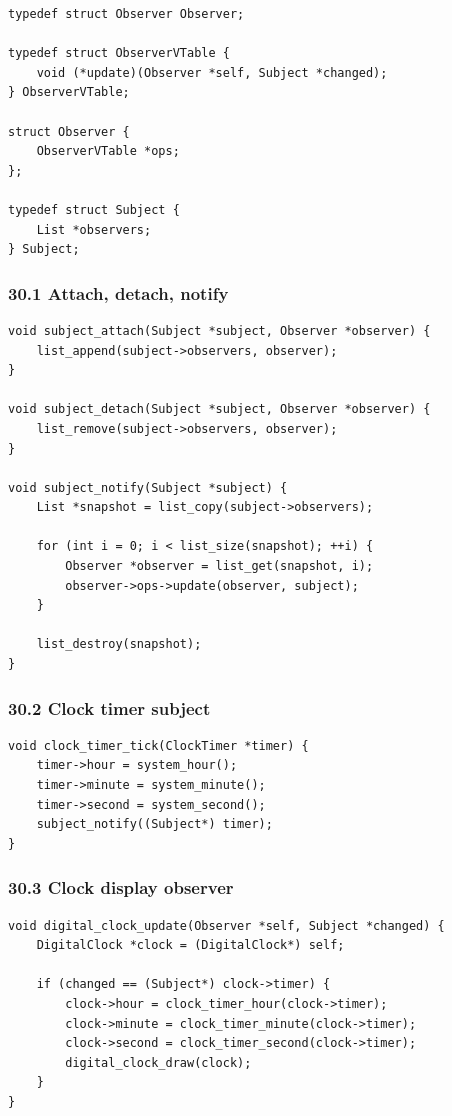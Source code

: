 \documentclass[11pt]{article}
\begin{document}
\begin{verbatim}
typedef struct Observer Observer;

typedef struct ObserverVTable {
    void (*update)(Observer *self, Subject *changed);
} ObserverVTable;

struct Observer {
    ObserverVTable *ops;
};

typedef struct Subject {
    List *observers;
} Subject;
\end{verbatim}

\subsubsection{30.1 Attach, detach, notify}\label{attach-detach-notify}

\begin{verbatim}
void subject_attach(Subject *subject, Observer *observer) {
    list_append(subject->observers, observer);
}

void subject_detach(Subject *subject, Observer *observer) {
    list_remove(subject->observers, observer);
}

void subject_notify(Subject *subject) {
    List *snapshot = list_copy(subject->observers);

    for (int i = 0; i < list_size(snapshot); ++i) {
        Observer *observer = list_get(snapshot, i);
        observer->ops->update(observer, subject);
    }

    list_destroy(snapshot);
}
\end{verbatim}

\subsubsection{30.2 Clock timer subject}\label{clock-timer-subject}

\begin{verbatim}
void clock_timer_tick(ClockTimer *timer) {
    timer->hour = system_hour();
    timer->minute = system_minute();
    timer->second = system_second();
    subject_notify((Subject*) timer);
}
\end{verbatim}

\subsubsection{30.3 Clock display observer}\label{clock-display-observer}

\begin{verbatim}
void digital_clock_update(Observer *self, Subject *changed) {
    DigitalClock *clock = (DigitalClock*) self;

    if (changed == (Subject*) clock->timer) {
        clock->hour = clock_timer_hour(clock->timer);
        clock->minute = clock_timer_minute(clock->timer);
        clock->second = clock_timer_second(clock->timer);
        digital_clock_draw(clock);
    }
}
\end{verbatim}
\end{document}
